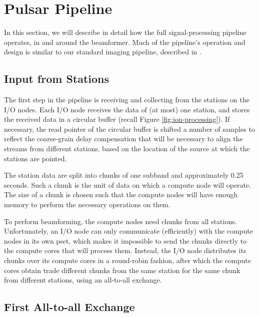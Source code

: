 \documentclass{llncs}
\begin{document}
\section{Pulsar Pipeline}


In this section, we will describe in detail how the full signal-processing pipeline operates, in and around the beamformer. Much of the pipeline's operation and design is similar to our standard imaging pipeline, described in \cite{Romein:10a}.

\subsection{Input from Stations}
The first step in the pipeline is receiving and collecting from the stations on the I/O nodes. Each I/O node receives the data of (at most) one station, and stores the received data in a circular buffer (recall Figure \ref{fig:ion-processing}). If necessary, the read pointer of the circular buffer is shifted a number of samples to reflect the coarse-grain delay compensation that will be necessary to align the streams from different stations, based on the location of the source at which the stations are pointed.

The station data are split into chunks of one subband and approximately 0.25 seconds. Such a chunk is the unit of data on which a compute node will operate. The size of a chunk is chosen such that the compute nodes will have enough memory to perform the necessary operations on them.

To perform beamforming, the compute nodes need chunks from all stations. Unfortunately, an I/O node can only communicate (efficiently) with the compute nodes in its own pset, which makes it impossible to send the chunks directly to the compute cores that will process them. Instead, the I/O node distributes its chunks over its compute cores in a round-robin fashion, after which the compute cores obtain trade different chunks from the same station for the same chunk from different stations, using an all-to-all exchange.

\subsection{First All-to-all Exchange}
\end{document}
